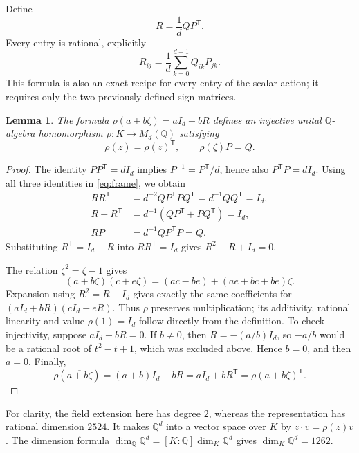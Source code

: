 \documentclass[10pt]{article}
\newtheorem{lemma}[theorem]{Lemma}
\newcommand{\Q}{\mathbb Q}
\begin{document}
Define
\[
 R=\frac1d QP^{\mathsf T}.
\]
Every entry is rational, explicitly
\[
 R_{ij}=\frac1d\sum_{k=0}^{d-1}Q_{ik}P_{jk}.
\]
This formula is also an exact recipe for every entry of the scalar
action; it requires only the two previously defined sign matrices.

\begin{lemma}\label{lem:sixth-root-action}
The formula $\rho(a+b\zeta)=aI_d+bR$ defines an injective unital
$\Q$-algebra homomorphism $\rho:K\longrightarrow M_d(\Q)$ satisfying
\[
 \rho(\bar z)=\rho(z)^{\mathsf T},\qquad \rho(\zeta)P=Q.
\]
\end{lemma}

\begin{proof}
The identity $PP^{\mathsf T}=dI_d$ implies
$P^{-1}=P^{\mathsf T}/d$, hence also $P^{\mathsf T}P=dI_d$.
Using all three identities in \eqref{eq:frame}, we obtain
\begin{align*}
 RR^{\mathsf T}
 &=d^{-2}QP^{\mathsf T}PQ^{\mathsf T}
   =d^{-1}QQ^{\mathsf T}=I_d,\\
 R+R^{\mathsf T}
 &=d^{-1}(QP^{\mathsf T}+PQ^{\mathsf T})=I_d,\\
 RP&=d^{-1}QP^{\mathsf T}P=Q.
\end{align*}
Substituting $R^{\mathsf T}=I_d-R$ into $RR^{\mathsf T}=I_d$ gives
$R^2-R+I_d=0$.

The relation $\zeta^2=\zeta-1$ gives
\[
 (a+b\zeta)(c+e\zeta)
       =(ac-be)+(ae+bc+be)\zeta.
\]
Expansion using $R^2=R-I_d$ gives exactly the same coefficients for
$(aI_d+bR)(cI_d+eR)$. Thus $\rho$ preserves multiplication; its
additivity, rational linearity and value $\rho(1)=I_d$ follow directly
from the definition. To check injectivity, suppose $aI_d+bR=0$.
If $b\ne0$, then $R=-(a/b)I_d$, so $-a/b$ would be a rational root
of $t^2-t+1$, which was excluded above. Hence $b=0$, and then $a=0$.
Finally,
\[
 \rho(\overline{a+b\zeta})
 =(a+b)I_d-bR=aI_d+bR^{\mathsf T}
 =\rho(a+b\zeta)^{\mathsf T}.
\]
\end{proof}

For clarity, the field extension here has degree $2$, whereas the
representation has rational dimension $2524$. It makes $\Q^d$ into a
vector space over $K$ by $z\cdot v=\rho(z)v$. The dimension formula
$\dim_\Q\Q^d=[K:\Q]\dim_K\Q^d$ gives $\dim_K\Q^d=1262$.
\end{document}
